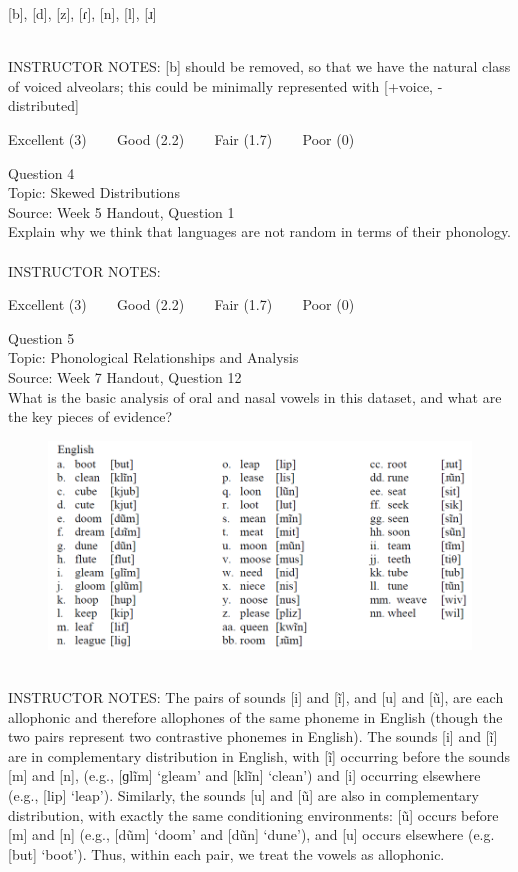 \documentclass[12pt]{article}
\begin{document}
{[b]}, {[d]}, {[z]}, {[ɾ]}, {[n]}, {[l]}, {[ɹ]}


~\\
INSTRUCTOR NOTES: [b] should be removed, so that we have the natural class of voiced alveolars; this could be minimally represented with [+voice, -distributed]


\vfill
Excellent (3) ~~~ Good (2.2) ~~~ Fair (1.7) ~~~ Poor (0)
\newpage

{\large Question 4}\\

Topic: Skewed Distributions\\
Source: Week 5 Handout, Question 1\\

Explain why we think that languages are not random in terms of their phonology.\\


~\\
INSTRUCTOR NOTES: 


\vfill
Excellent (3) ~~~ Good (2.2) ~~~ Fair (1.7) ~~~ Poor (0)
\newpage

{\large Question 5}\\

Topic: Phonological Relationships and Analysis\\
Source: Week 7 Handout, Question 12\\

What is the basic analysis of oral and nasal vowels in this dataset, and what are the key pieces of evidence?\\

\begin{figure}[H]
\includegraphics{../images/english12.png}
\end{figure}

~\\
INSTRUCTOR NOTES: The pairs of sounds [i] and [ĩ], and [u] and [ũ], are each allophonic and therefore allophones of the same phoneme in English (though the two pairs represent two contrastive phonemes in English). The sounds [i] and [ĩ] are in complementary distribution in English, with [ĩ] occurring before the sounds [m] and [n], (e.g., [ɡlĩm] ‘gleam’ and [klĩn] ‘clean’) and [i] occurring elsewhere (e.g., [lip] ‘leap’). Similarly, the sounds [u] and [ũ] are also in complementary distribution, with exactly the same conditioning environments: [ũ] occurs before [m] and [n] (e.g., [dũm] ‘doom’ and [dũn] ‘dune’), and [u] occurs elsewhere (e.g. [but] ‘boot’). Thus, within each pair, we treat the vowels as allophonic. 
\end{document}
